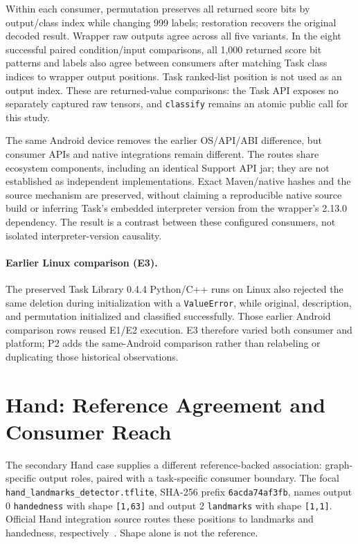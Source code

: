 \documentclass[10pt,twocolumn,letterpaper]{article}
\newcommand{\code}[1]{\texttt{#1}}
\begin{document}
Within each consumer, permutation preserves all returned score bits by output/class index while changing 999 labels; restoration recovers the original decoded result. Wrapper raw outputs agree across all five variants. In the eight successful paired condition/input comparisons, all 1,000 returned score bit patterns and labels also agree between consumers after matching Task class indices to wrapper output positions. Task ranked-list position is not used as an output index. These are returned-value comparisons: the Task API exposes no separately captured raw tensors, and \code{classify} remains an atomic public call for this study.

The same Android device removes the earlier OS/API/ABI difference, but consumer APIs and native integrations remain different. The routes share ecosystem components, including an identical Support API jar; they are not established as independent implementations. Exact Maven/native hashes and the source mechanism are preserved, without claiming a reproducible native source build or inferring Task's embedded interpreter version from the wrapper's 2.13.0 dependency. The result is a contrast between these configured consumers, not isolated interpreter-version causality.

\paragraph{Earlier Linux comparison (E3).}
The preserved Task Library 0.4.4 Python/C++ runs on Linux also rejected the same deletion during initialization with a \code{ValueError}, while original, description, and permutation initialized and classified successfully. Those earlier Android comparison rows reused E1/E2 execution. E3 therefore varied both consumer and platform; P2 adds the same-Android comparison rather than relabeling or duplicating those historical observations.

\section{Hand: Reference Agreement and Consumer Reach}
\label{sec:hand}
The secondary Hand case supplies a different reference-backed association: graph-specific output roles, paired with a task-specific consumer boundary. The focal \code{hand\_landmarks\_detector.tflite}, SHA-256 prefix \code{6acda74af3fb}, names output 0 \code{handedness} with shape \code{[1,63]} and output 2 \code{landmarks} with shape \code{[1,1]}. Official Hand integration source routes these positions to landmarks and handedness, respectively~\cite{hand-graph}. Shape alone is not the reference.
\end{document}
